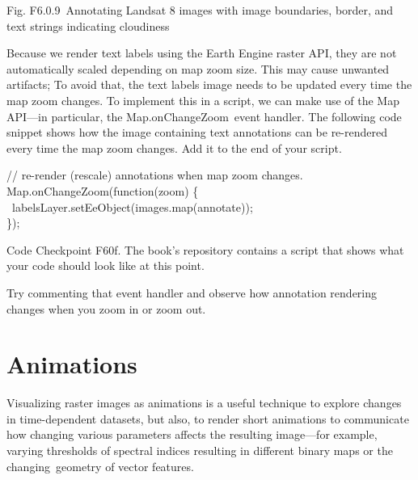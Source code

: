 \documentclass[
  letterpaper,
  DIV=11,
  numbers=noendperiod]{scrreprt}
\begin{document}
Fig. F6.0.9~Annotating Landsat 8 images with image boundaries, border,
and text strings indicating cloudiness

Because we render text labels using the Earth Engine raster API, they
are not automatically scaled depending on map zoom size. This may cause
unwanted artifacts; To avoid that, the text labels image needs to be
updated every time the map zoom changes. To implement this in a script,
we can make use of the Map API---in particular, the
Map.onChangeZoom~event handler. The following code snippet shows how the
image containing text annotations can be re-rendered every time the map
zoom changes. Add it to the end of your script.

// re-render (rescale) annotations when map zoom changes.\\
Map.onChangeZoom(function(zoom) \{\\
\hspace*{0.333em} ~labelsLayer.setEeObject(images.map(annotate));\\
\});

\begin{tcolorbox}[enhanced jigsaw, left=2mm, breakable, rightrule=.15mm, opacityback=0, colframe=quarto-callout-note-color-frame, colbacktitle=quarto-callout-note-color!10!white, arc=.35mm, opacitybacktitle=0.6, toptitle=1mm, colback=white, leftrule=.75mm, title=\textcolor{quarto-callout-note-color}{\faInfo}\hspace{0.5em}{Note}, toprule=.15mm, bottomtitle=1mm, titlerule=0mm, bottomrule=.15mm, coltitle=black]

Code Checkpoint F60f. The book's repository contains a script that shows
what your code should look like at this point.

\end{tcolorbox}

Try commenting that event handler and observe how annotation rendering
changes when you zoom in or zoom out.

\hypertarget{animations}{%
\section{Animations}\label{animations}}

Visualizing raster images as animations is a useful technique to explore
changes in time-dependent datasets, but also, to render short animations
to communicate how changing various parameters affects the resulting
image---for example, varying thresholds of spectral indices resulting in
different binary maps or the changing~geometry of vector features.
\end{document}
